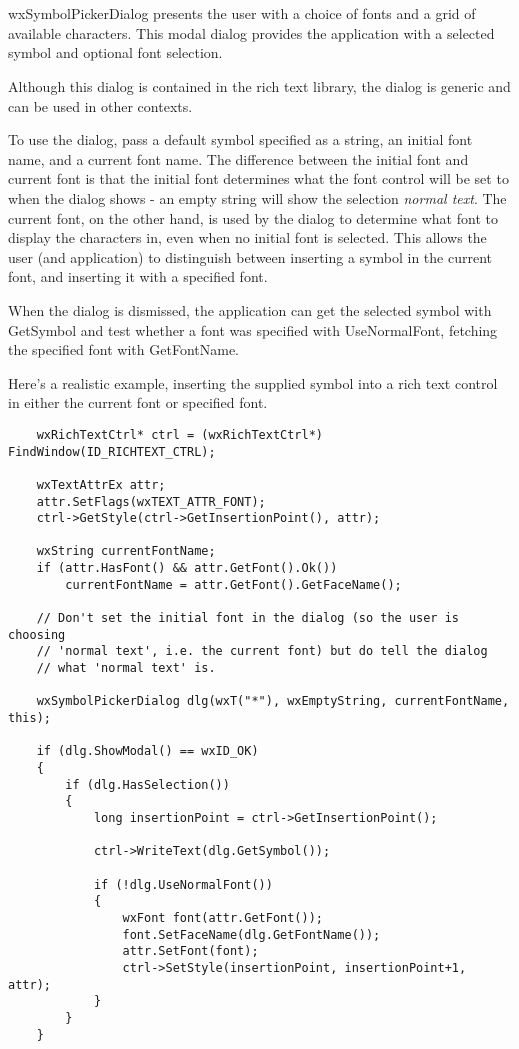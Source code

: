 \section{}\label{wxsymbolpickerdialog}

wxSymbolPickerDialog presents the user with a choice of fonts and a grid
of available characters. This modal dialog provides the application with
a selected symbol and optional font selection.

Although this dialog is contained in the rich text library, the dialog
is generic and can be used in other contexts.

To use the dialog, pass a default symbol specified as a string, an initial font name,
and a current font name. The difference between the initial font and
current font is that the initial font determines what the font control will be
set to when the dialog shows - an empty string will show the selection {\it normal text}.
The current font, on the other hand, is used by the dialog to determine what font
to display the characters in, even when no initial font is selected.
This allows the user (and application) to distinguish between inserting a
symbol in the current font, and inserting it with a specified font.

When the dialog is dismissed, the application can get the selected symbol
with GetSymbol and test whether a font was specified with UseNormalFont,
fetching the specified font with GetFontName.

Here's a realistic example, inserting the supplied symbol into a
rich text control in either the current font or specified font.

\begin{verbatim}
    wxRichTextCtrl* ctrl = (wxRichTextCtrl*) FindWindow(ID_RICHTEXT_CTRL);

    wxTextAttrEx attr;
    attr.SetFlags(wxTEXT_ATTR_FONT);
    ctrl->GetStyle(ctrl->GetInsertionPoint(), attr);

    wxString currentFontName;
    if (attr.HasFont() && attr.GetFont().Ok())
        currentFontName = attr.GetFont().GetFaceName();

    // Don't set the initial font in the dialog (so the user is choosing
    // 'normal text', i.e. the current font) but do tell the dialog
    // what 'normal text' is.

    wxSymbolPickerDialog dlg(wxT("*"), wxEmptyString, currentFontName, this);

    if (dlg.ShowModal() == wxID_OK)
    {
        if (dlg.HasSelection())
        {
            long insertionPoint = ctrl->GetInsertionPoint();

            ctrl->WriteText(dlg.GetSymbol());

            if (!dlg.UseNormalFont())
            {
                wxFont font(attr.GetFont());
                font.SetFaceName(dlg.GetFontName());
                attr.SetFont(font);
                ctrl->SetStyle(insertionPoint, insertionPoint+1, attr);
            }
        }
    }
\end{verbatim}

